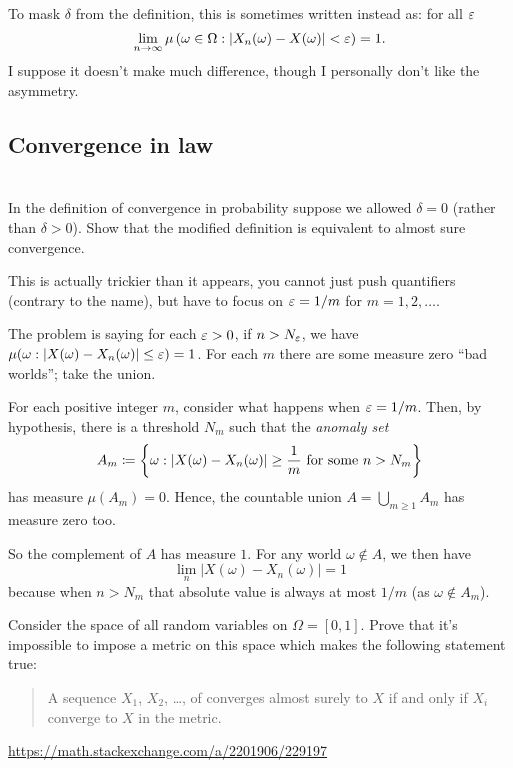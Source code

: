 \begin{remark}
	To mask $\delta$ from the definition,
	this is sometimes written instead as:
	for all $\varepsilon$
	\[ \lim_{n \to \infty} \mu \left( \omega \in \Omega :
		\left\lvert X_n(\omega) - X(\omega) \right\rvert < \varepsilon
		\right) = 1. \]
	I suppose it doesn't make much difference,
	though I personally don't like the asymmetry.
\end{remark}

\subsection{Convergence in law}

\section{\problemhead}
\begin{problem}
	\gim
	In the definition of convergence in probability
	suppose we allowed $\delta = 0$
	(rather than $\delta > 0$).
	Show that the modified definition is
	equivalent to almost sure convergence.
	\begin{hint}
		This is actually trickier than it appears,
		you cannot just push quantifiers (contrary to the name),
		but have to focus on $\varepsilon = 1/m$ for $m = 1, 2, \dots$.

		The problem is saying for each $\varepsilon > 0$,
		if $n > N_\varepsilon$, we have
		$\mu(\omega : |X(\omega)-X_n(\omega)| \le \varepsilon) = 1$.
		For each $m$ there are some measure zero ``bad worlds'';
		take the union.
	\end{hint}
	\begin{sol}
		For each positive integer $m$,
		consider what happens when $\varepsilon = 1/m$.
		Then, by hypothesis, there is a threshold $N_m$
		such that the \emph{anomaly set}
		\[ A_m \coloneqq \left\{ \omega :
			|X(\omega)-X_n(\omega)| \ge \frac 1m
			\text{ for some } n > N_m \right\} \]
		has measure $\mu(A_m) = 0$.
		Hence, the countable union $A = \bigcup_{m \ge 1} A_m$ has measure zero too.

		So the complement of $A$ has measure $1$.
		For any world $\omega \notin A$,
		we then have 
		\[ \lim_n \left\lvert X(\omega) - X_n(\omega) \right\rvert = 1 \]
		because when $n > N_m$ that absolute value
		is always at most $1/m$ (as $\omega \notin A_m$).
	\end{sol}
\end{problem}

\begin{problem}
	Consider the space of all random variables on $\Omega = [0,1]$.
	Prove that it's impossible to impose a metric on this space
	which makes the following statement true:
	\begin{quote}
		A sequence $X_1$, $X_2$, \dots, of converges almost surely to $X$
		if and only if $X_i$ converge to $X$ in the metric.
	\end{quote}
	\begin{sol}
		\url{https://math.stackexchange.com/a/2201906/229197}
	\end{sol}
\end{problem}
